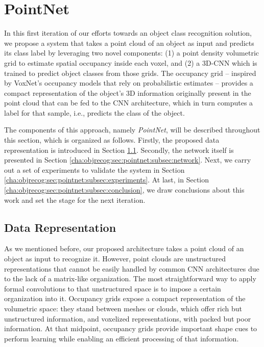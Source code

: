 \section{PointNet}
\label{cha:objrecog:sec:pointnet}

In this first iteration of our efforts towards an object class recognition solution, we propose a system that takes a point cloud of an object as input and predicts its class label by leveraging two novel components: (1) a point density volumetric grid to estimate spatial occupancy inside each voxel, and (2) a \ac{3D}-\ac{CNN} which is trained to predict object classes from those grids. The occupancy grid -- inspired by VoxNet's \cite{Maturana2015} occupancy models that rely on probabilistic estimates -- provides a compact representation of the object's \ac{3D} information originally present in the point cloud that can be fed to the \ac{CNN} architecture, which in turn computes a label for that sample, i.e., predicts the class of the object. 

The components of this approach, namely \emph{PointNet}, will be described throughout this section, which is organized as follows. Firstly, the proposed data representation is introduced in Section \ref{cha:objrecog:sec:pointnet:subsec:data}. Secondly, the network itself is presented in Section \ref{cha:objrecog:sec:pointnet:subsec:network}. Next, we carry out a set of experiments to validate the system in Section \ref{cha:objrecog:sec:pointnet:subsec:experiments}. At last, in Section \ref{cha:objrecog:sec:pointnet:subsec:conclusion}, we draw conclusions about this work and set the stage for the next iteration.

\subsection{Data Representation}
\label{cha:objrecog:sec:pointnet:subsec:data}

As we mentioned before, our proposed architecture takes a point cloud of an object as input to recognize it. However, point clouds are unstructured representations that cannot be easily handled by common \ac{CNN} architectures due to the lack of a matrix-like organization. The most straightforward way to apply formal convolutions to that unstructured space is to impose a certain organization into it. Occupancy grids expose a compact representation of the volumetric space: they stand between meshes or clouds, which offer rich but unstructured information, and voxelized representations, with packed but poor information. At that midpoint, occupancy grids provide important shape cues to perform learning while enabling an efficient processing of that information.

